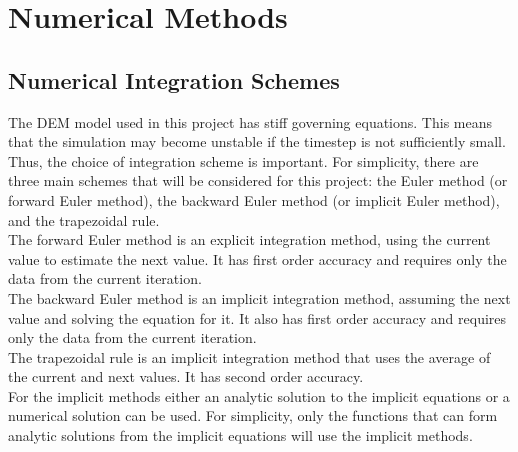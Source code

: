 \documentclass[10pt,a4paper,titlepage]{report}
\begin{document}
\chapter{Numerical Methods}
\label{ch:Numerical Methods}
\section{Numerical Integration Schemes}
The DEM model used in this project has stiff governing equations. This means that the simulation may become unstable if the timestep is not sufficiently small. Thus, the choice of integration scheme is important. For simplicity, there are three main schemes that will be considered for this project: the Euler method (or forward Euler method), the backward Euler method (or implicit Euler method), and the trapezoidal rule.
\\The forward Euler method is an explicit integration method, using the current value to estimate the next value. It has first order accuracy and requires only the data from the current iteration.
\\The backward Euler method is an implicit integration method, assuming the next value and solving the equation for it. It also has first order accuracy and requires only the data from the current iteration.
\\The trapezoidal rule is an implicit integration method that uses the average of the current and next values. It has second order accuracy.
\\For the implicit methods either an analytic solution to the implicit equations or a numerical solution can be used. For simplicity, only the functions that can form analytic solutions from the implicit equations will use the implicit methods.
\end{document}
